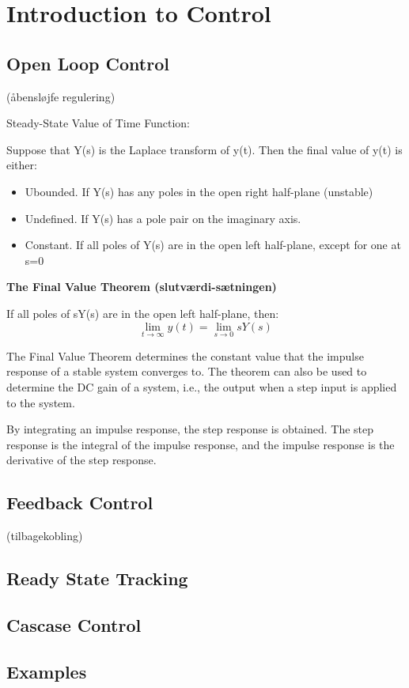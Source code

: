\section{Introduction to Control}

\subsection{Open Loop Control}
(åbensløjfe regulering)

Steady-State Value of Time Function:

Suppose that Y(s) is the Laplace transform of y(t). Then the final value of y(t) is either:
\begin{itemize}
	\item{Ubounded. If Y(s) has any poles in the open right half-plane (unstable)}
	\item{Undefined. If Y(s) has a pole pair on the imaginary axis.}
	\item{Constant. If all poles of Y(s) are in the open left half-plane, except for one at s=0}
\end{itemize}

\textbf{The Final Value Theorem (slutværdi-sætningen)}

If all poles of sY(s) are in the open left half-plane, then:
$$\lim_{t \to \infty} y(t) = \lim_{s \to 0} sY(s)$$

The Final Value Theorem determines the constant value that the impulse response of a stable system converges to.
The theorem can also be used to determine the DC gain of a system, i.e., the output when a step input is applied to the system.

By integrating an impulse response, the step response is obtained. The step response is the integral of the impulse response,
and the impulse response is the derivative of the step response.



\subsection{Feedback Control}
(tilbagekobling)
\subsection{Ready State Tracking}



\subsection{Cascase Control}







\subsection{Examples}
